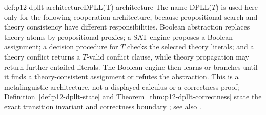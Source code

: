 \begin{hbmethod}{def:p12-dpllt-architecture}{DPLL(T) architecture}
The name DPLL(\(T\)) is used here only for the following cooperation
architecture, because propositional search and theory consistency have
different responsibilities.  Boolean abstraction replaces theory atoms by
propositional proxies; a SAT engine proposes a Boolean assignment; a
decision procedure for \(T\) checks the selected theory literals; and a theory
conflict returns a \(T\)-valid conflict clause, while theory propagation may
return further entailed literals.  The Boolean engine then learns or branches
until it finds a theory-consistent assignment or refutes the abstraction.
This is a metalinguistic architecture, not a displayed calculus or a
correctness proof; Definition~\ref{def:p12-dpllt-state} and
Theorem~\ref{thm:p12-dpllt-correctness} state the exact transition invariant
and correctness boundary
\cite{NieuwenhuisOliverasTinelli2006}; see also
\cite{BarrettSebastianiSeshiaTinelli2009}.
\end{hbmethod}


